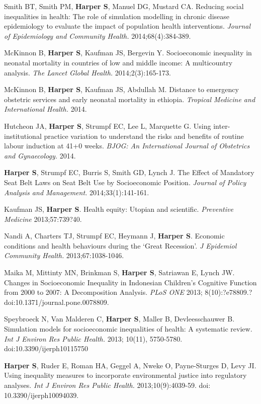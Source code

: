 \documentclass[
  letterpaper,
  DIV=11,
  numbers=noendperiod]{scrartcl}
\begin{document}
Smith BT, Smith PM, \textbf{Harper S}, Manuel DG, Mustard CA. Reducing
social inequalities in health: The role of simulation modelling in
chronic disease epidemiology to evaluate the impact of population health
interventions. \emph{Journal of Epidemiology and Community Health.}
2014;68(4):384-389.

McKinnon B, \textbf{Harper S}, Kaufman JS, Bergevin Y. Socioeconomic
inequality in neonatal mortality in countries of low and middle income:
A multicountry analysis. \emph{The Lancet Global Health.}
2014;2(3):165-173.

McKinnon B, \textbf{Harper S}, Kaufman JS, Abdullah M. Distance to
emergency obstetric services and early neonatal mortality in ethiopia.
\emph{Tropical Medicine and International Health.} 2014.

Hutcheon JA, \textbf{Harper S}, Strumpf EC, Lee L, Marquette G. Using
inter-institutional practice variation to understand the risks and
benefits of routine labour induction at 41+0 weeks. \emph{BJOG: An
International Journal of Obstetrics and Gynaecology.} 2014.

\textbf{Harper S}, Strumpf EC, Burris S, Smith GD, Lynch J. The Effect
of Mandatory Seat Belt Laws on Seat Belt Use by Socioeconomic Position.
\emph{Journal of Policy Analysis and Management.} 2014;33(1):141-161.

Kaufman JS, \textbf{Harper S}. Health equity: Utopian and scientific.
\emph{Preventive Medicine} 2013;57:739?40.

Nandi A, Charters TJ, Strumpf EC, Heymann J, \textbf{Harper S}. Economic
conditions and health behaviours during the `Great Recession'. \emph{J
Epidemiol Community Health.} 2013;67:1038-1046.

Maika M, Mittinty MN, Brinkman S, \textbf{Harper S}, Satriawan E, Lynch
JW. Changes in Socioeconomic Inequality in Indonesian Children's
Cognitive Function from 2000 to 2007: A Decomposition Analysis.
\emph{PLoS ONE} 2013; 8(10):?e78809.?doi:10.1371/journal.pone.0078809.

Speybroeck N, Van Malderen C, \textbf{Harper S}, Maller B,
Devleesschauwer B. Simulation models for socioeconomic inequalities of
health: A systematic review. \emph{Int J Environ Res Public Health.}
2013; 10(11), 5750-5780. doi:10.3390/ijerph10115750

\textbf{Harper S}, Ruder E, Roman HA, Geggel A, Nweke O, Payne-Sturges
D, Levy JI. Using inequality measures to incorporate environmental
justice into regulatory analyses. \emph{Int J Environ Res Public
Health.} 2013;10(9):4039-59. doi: 10.3390/ijerph10094039.
\end{document}
